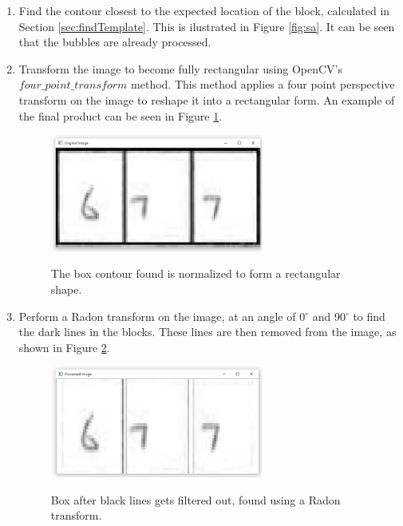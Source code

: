 \begin{enumerate}
\item Find the contour closest to the expected location of the block, calculated in Section \ref{sec:findTemplate}. This is ilustrated in Figure \ref{fig:sa}. It can be seen that the bubbles are already processed.

\item Transform the image to become fully rectangular using OpenCV's $four\_point\_transform$ method. This method applies a four point perspective transform on the image to reshape it into a rectangular form. An example of the final product can be seen in Figure \ref{fig:bp}.

\begin{figure}
  \centering
  \includegraphics[width=7cm]{BeforeProcessing}\\
  \caption{The box contour found is normalized to form a rectangular shape.}
  \label{fig:bp}
\end{figure}

\item Perform a Radon transform on the image, at an angle of 0$^{\circ}$ and 90$^{\circ}$ to find the dark lines in the blocks. These lines are then removed from the image, as shown in Figure \ref{fig:ar}. 

\begin{figure}
  \centering
  \includegraphics[width=7cm]{AfterRadon}\\
  \caption{Box after black lines gets filtered out, found using a Radon transform.}
  \label{fig:ar}
\end{figure}


\end{enumerate}
